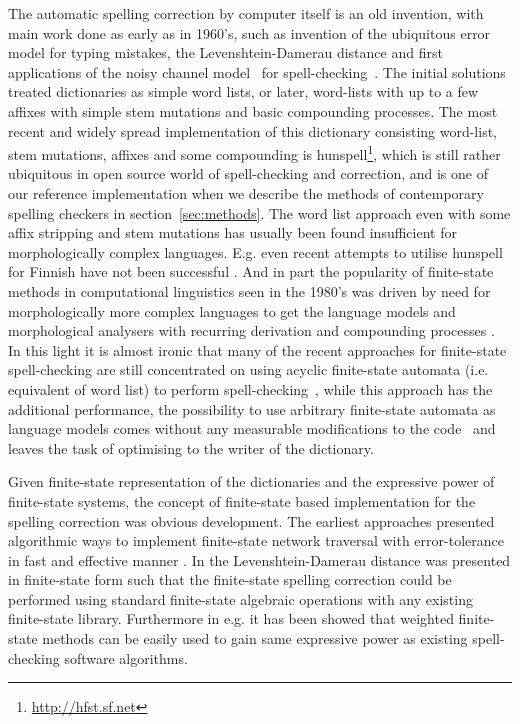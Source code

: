 \documentclass[a4paper,12pt]{article}
\begin{document}
The automatic spelling correction by computer itself is an old invention, with
main work done as early as in 1960's, such as invention of the ubiquitous error
model for typing mistakes, the Levenshtein-Damerau distance
\cite[]{levenshtein/1966,damerau/1964} and first applications of the noisy
channel model~\cite[]{shannon/1948} for spell-checking~\cite[]{raviv/1967}.
The initial solutions treated dictionaries as simple word lists, or later,
word-lists with up to a few affixes with simple stem mutations and basic
compounding processes. The most recent and widely spread implementation of this
dictionary consisting word-list, stem mutations, affixes and some compounding
is hunspell\footnote{\url{http://hfst.sf.net}}, which is still rather
ubiquitous in open source world of spell-checking and correction, and is one of
our reference implementation when we describe the methods of contemporary
spelling checkers in section~\ref{sec:methods}. The word list approach even
with some affix stripping and stem mutations has usually been found
insufficient for morphologically complex languages.  E.g. even recent attempts
to utilise hunspell for Finnish have not been successful
\cite[]{pitkanen/2006}. And in part the popularity of finite-state methods in
computational linguistics seen in the 1980's was driven by need for
morphologically more complex languages to get the language models and
morphological analysers with recurring derivation and compounding processes
\cite[]{beesley2004morphological}.  In this light it is almost ironic that many
of the recent approaches for finite-state spell-checking are still concentrated
on using acyclic finite-state automata (i.e. equivalent of word list) to
perform spell-checking~\cite[]{watson2003new,deorowicz2005correcting}, while
this approach has the additional performance, the possibility to use arbitrary
finite-state automata as language models comes without any measurable
modifications to the code~\cite[e.g.][]{pirinen/2010/lrec} and leaves the task
of optimising to the writer of the dictionary.

Given finite-state representation of the dictionaries and the expressive power
of finite-state systems, the concept of finite-state based implementation for
the spelling correction was obvious development. The earliest approaches
presented algorithmic ways to implement finite-state network traversal with
error-tolerance \cite[]{oflazer/1996} in fast and effective manner
\cite[]{agata/2002,hulden/2009}.  In \cite{schulz/2002} the Levenshtein-Damerau
distance was presented in finite-state form such that the finite-state spelling
correction could be performed using standard finite-state algebraic operations
with any existing finite-state library. Furthermore in e.g.
\cite{pirinen/2010/lrec} it has been showed that weighted finite-state methods
can be easily used to gain same expressive power as existing spell-checking
software algorithms.
\end{document}
